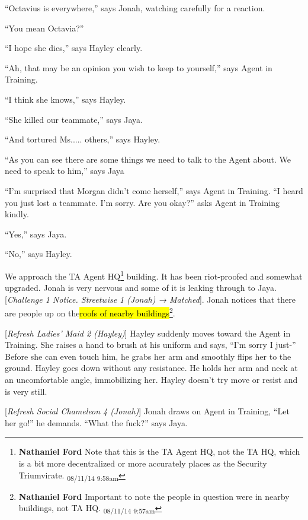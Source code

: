 ``Octavius is everywhere,'' says Jonah, watching carefully for a reaction.

``You mean Octavia?''

``I hope she dies,'' says Hayley clearly.

``Ah, that may be an opinion you wish to keep to yourself,'' says Agent in Training.

``I think she knows,'' says Hayley.

``She killed our teammate,'' says Jaya.

``And tortured Ms..... others,'' says Hayley.

``As you can see there are some things we need to talk to the Agent about.  We need to speak to him,'' says Jaya

``I'm surprised that Morgan didn't come herself,'' says Agent in Training.  ``I heard you just lost a teammate.  I'm sorry.  Are you okay?'' asks Agent in Training kindly.

``Yes,'' says Jaya.

``No,'' says Hayley.



We approach the TA Agent HQ\footnote{\textbf{Nathaniel Ford }Note that this is the TA Agent HQ, not the TA HQ, which is a bit more decentralized or more accurately places as the Security Triumvirate. \textsubscript{08/11/14 9:58am}} building.  It has been riot-proofed and somewhat upgraded.  Jonah is very nervous and some of it is leaking through to Jaya.  {[}\textit{Challenge 1 Notice.  Streetwise 1 (Jonah) → Matched}{]}.  Jonah notices that there are people up on the\hl{roofs of nearby buildings}\footnote{\textbf{Nathaniel Ford }Important to note the people in question were in nearby buildings, not TA HQ. \textsubscript{08/11/14 9:57am}}.



{[}\textit{Refresh Ladies' Maid 2 (Hayley)}{]} Hayley suddenly moves toward the Agent in Training.  She raises a hand to brush at his uniform and says, ``I'm sorry I just-''  Before she can even touch him, he grabs her arm and smoothly flips her to the ground.  Hayley goes down without any resistance.  He holds her arm and neck at an uncomfortable angle, immobilizing her.  Hayley doesn't try move or resist and is very still. 



{[}\textit{Refresh Social Chameleon 4 (Jonah)}{]} Jonah draws on Agent in Training, ``Let her go!'' he demands.  ``What the fuck?'' says Jaya.  

